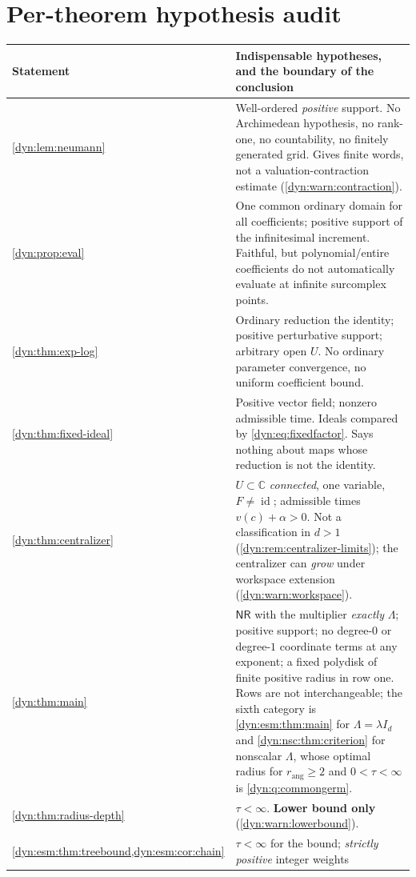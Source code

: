 \documentclass[11pt,letterpaper]{article}
\theoremstyle{definition}
\theoremstyle{remark}
\newcommand{\C}{\mathbb C}
\newcommand{\id}{\operatorname{id}}
\newcommand{\nres}{\mathsf{NR}}
\newcommand{\rang}{r_{\mathrm{ang}}}
\numberwithin{equation}{section}
\begin{document}
\section{Per-theorem hypothesis audit}
\label{dyn:app:audit}

\begin{longtable}{@{}P{0.26\textwidth}P{0.67\textwidth}@{}}
\toprule
Statement & Indispensable hypotheses, and the boundary of the conclusion\\
\midrule
\endhead
\cref{dyn:lem:neumann} &
Well-ordered \emph{positive} support. No Archimedean hypothesis, no
rank-one, no countability, no finitely generated grid. Gives finite words,
not a valuation-contraction estimate
(\cref{dyn:warn:contraction}).\\[3pt]
\cref{dyn:prop:eval} &
One common ordinary domain for all coefficients; positive support of the
infinitesimal increment. Faithful, but polynomial/entire coefficients do
not automatically evaluate at infinite surcomplex points.\\[3pt]
\cref{dyn:thm:exp-log} &
Ordinary reduction the identity; positive perturbative support; arbitrary
open $U$. No ordinary parameter convergence, no uniform coefficient
bound.\\[3pt]
\cref{dyn:thm:fixed-ideal} &
Positive vector field; nonzero admissible time. Ideals compared by
\eqref{dyn:eq:fixedfactor}. Says nothing about maps whose reduction is not
the identity.\\[3pt]
\cref{dyn:thm:centralizer} &
$U\subset\C$ \emph{connected}, one variable, $F\ne\id$; admissible times
$v(c)+\alpha>0$. Not a classification in $d>1$
(\cref{dyn:rem:centralizer-limits}); the centralizer can \emph{grow} under
workspace extension (\cref{dyn:warn:workspace}).\\[3pt]
\cref{dyn:thm:main} &
$\nres$ with the multiplier \emph{exactly} $\Lambda$; positive support;
no degree-$0$ or degree-$1$ coordinate terms at any exponent; a fixed
polydisk of finite positive radius in row one. Rows are not
interchangeable; the sixth category is \cref{dyn:esm:thm:main} for
$\Lambda=\lambda I_d$ and \cref{dyn:nsc:thm:criterion} for nonscalar
$\Lambda$, whose optimal radius for $\rang\ge2$ and $0<\tau<\infty$ is
\cref{dyn:q:commongerm}.\\[3pt]
\cref{dyn:thm:radius-depth} &
$\tau<\infty$. \textbf{Lower bound only}
(\cref{dyn:warn:lowerbound}).\\[3pt]
\cref{dyn:esm:thm:treebound,dyn:esm:cor:chain} &
$\tau<\infty$ for the bound; \emph{strictly positive} integer weights

\end{longtable}
\end{document}

